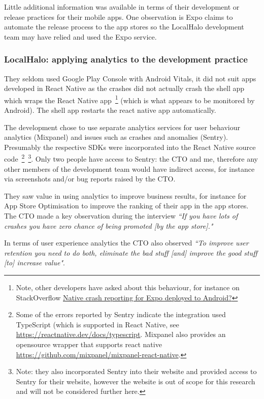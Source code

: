 Little additional information was available in terms of their development or release practices for their mobile apps. One observation is Expo claims to automate the release process to the app stores so the LocalHalo development team may have relied and used the Expo service.

\subsubsection{LocalHalo: applying analytics to the development practice}
They seldom used Google Play Console with Android Vitals, it did not suit apps developed in React Native as the crashes did not actually crash the shell app which wraps the React Native app~\footnote{Note, other developers have asked about this behaviour, for instance on StackOverflow \href{https://stackoverflow.com/questions/66166824/native-crash-reporting-for-expo-deployed-to-android/}{Native crash reporting for Expo deployed to Android?}} 
(which is what appears to be monitored by Android). The shell app restarts the react native app automatically.

The development chose to use separate analytics services for user behaviour analytics (Mixpanel) and issues such as crashes and anomalies (Sentry). Presumably the respective SDKs were incorporated into the React Native source code~\footnote{Some of the errors reported by Sentry indicate the integration used TypeScript (which is supported in React Native, see \url{https://reactnative.dev/docs/typescript}. Mixpanel also provides an opensource wrapper that supports react native \url{https://github.com/mixpanel/mixpanel-react-native}.}~\footnote{Note: they also incorporated Sentry into their website and provided access to Sentry for their website, however the website is out of scope for this research and will not be considered further here.}. Only two people have access to Sentry: the CTO and me, therefore any other members of the development team would have indirect access, for instance via screenshots and/or bug reports raised by the CTO. 

They saw value in using analytics to improve business results, for instance for App Store Optimisation to improve the ranking of their app in the app stores. The CTO made a key observation during the interview \emph{``If you have lots of crashes you have zero chance of being promoted [by the app store]."}

In terms of user experience analytics the CTO also observed \emph{``To improve user retention you need to do both, eliminate the bad stuff [and] improve the good stuff [to] increase value"}.

